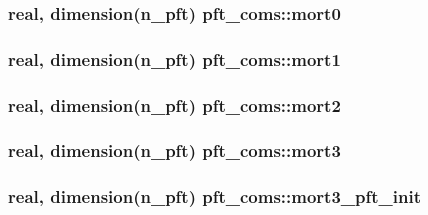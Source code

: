 \subsubsection[{mort0}]{\setlength{\rightskip}{0pt plus 5cm}real, dimension(n\+\_\+pft) pft\+\_\+coms\+::mort0}\label{namespacepft__coms_a70607e766522bb0ddd5329aa60d6b5e7}
\hypertarget{namespacepft__coms_a8a99e260a7d72b81ec6887289e4e8172}{}
\subsubsection[{mort1}]{\setlength{\rightskip}{0pt plus 5cm}real, dimension(n\+\_\+pft) pft\+\_\+coms\+::mort1}\label{namespacepft__coms_a8a99e260a7d72b81ec6887289e4e8172}
\hypertarget{namespacepft__coms_a869ad0792b73ae5285eeab0a57534f34}{}
\subsubsection[{mort2}]{\setlength{\rightskip}{0pt plus 5cm}real, dimension(n\+\_\+pft) pft\+\_\+coms\+::mort2}\label{namespacepft__coms_a869ad0792b73ae5285eeab0a57534f34}
\hypertarget{namespacepft__coms_a20a7ffd42484a2150383fd540cd97641}{}
\subsubsection[{mort3}]{\setlength{\rightskip}{0pt plus 5cm}real, dimension(n\+\_\+pft) pft\+\_\+coms\+::mort3}\label{namespacepft__coms_a20a7ffd42484a2150383fd540cd97641}
\hypertarget{namespacepft__coms_a1a1f98514e1c80f9ab10a76eacb4f7eb}{}
\subsubsection[{mort3\+\_\+pft\+\_\+init}]{\setlength{\rightskip}{0pt plus 5cm}real, dimension(n\+\_\+pft) pft\+\_\+coms\+::mort3\+\_\+pft\+\_\+init}\label{namespacepft__coms_a1a1f98514e1c80f9ab10a76eacb4f7eb}
\hypertarget{namespacepft__coms_a35da186f9b0c1860742f4496333703a7}{}

